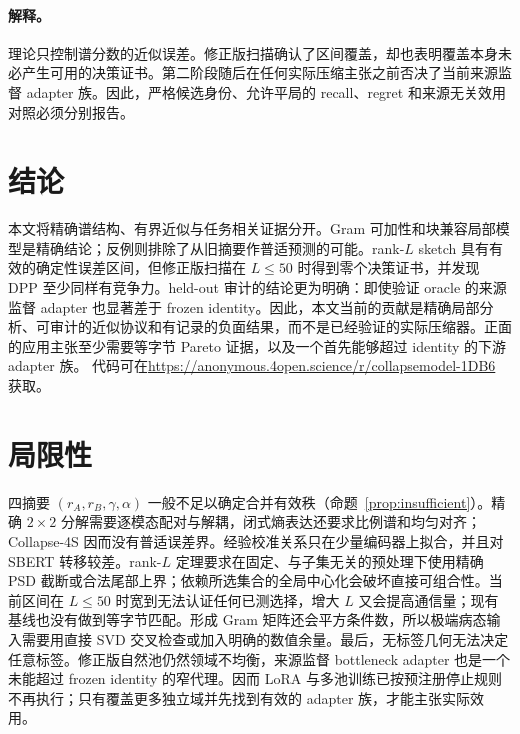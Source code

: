 \documentclass{article}
\begin{document}
\paragraph{解释。}
理论只控制谱分数的近似误差。修正版扫描确认了区间覆盖，却也表明覆盖本身未必产生可用的决策证书。第二阶段随后在任何实际压缩主张之前否决了当前来源监督 adapter 族。因此，严格候选身份、允许平局的 recall、regret 和来源无关效用对照必须分别报告。

\section{结论}
\label{sec:conclusion}

本文将精确谱结构、有界近似与任务相关证据分开。Gram 可加性和块兼容局部模型是精确结论；反例则排除了从旧摘要作普适预测的可能。rank-$L$ sketch 具有有效的确定性误差区间，但修正版扫描在 $L\leq50$ 时得到零个决策证书，并发现 DPP 至少同样有竞争力。held-out 审计的结论更为明确：即使验证 oracle 的来源监督 adapter 也显著差于 frozen identity。因此，本文当前的贡献是精确局部分析、可审计的近似协议和有记录的负面结果，而不是已经验证的实际压缩器。正面的应用主张至少需要等字节 Pareto 证据，以及一个首先能够超过 identity 的下游 adapter 族。
代码可在\url{https://anonymous.4open.science/r/collapsemodel-1DB6} 获取。




\appendix

\section{局限性}
\label{app:limitations}

四摘要 $(r_A,r_B,\gamma,\alpha)$ 一般不足以确定合并有效秩（命题~\ref{prop:insufficient}）。精确 $2\times2$ 分解需要逐模态配对与解耦，闭式熵表达还要求比例谱和均匀对齐；Collapse-4S 因而没有普适误差界。经验校准关系只在少量编码器上拟合，并且对 SBERT 转移较差。rank-$L$ 定理要求在固定、与子集无关的预处理下使用精确 PSD 截断或合法尾部上界；依赖所选集合的全局中心化会破坏直接可组合性。当前区间在 $L\leq50$ 时宽到无法认证任何已测选择，增大 $L$ 又会提高通信量；现有基线也没有做到等字节匹配。形成 Gram 矩阵还会平方条件数，所以极端病态输入需要用直接 SVD 交叉检查或加入明确的数值余量。最后，无标签几何无法决定任意标签。修正版自然池仍然领域不均衡，来源监督 bottleneck adapter 也是一个未能超过 frozen identity 的窄代理。因而 LoRA 与多池训练已按预注册停止规则不再执行；只有覆盖更多独立域并先找到有效的 adapter 族，才能主张实际效用。
\end{document}
